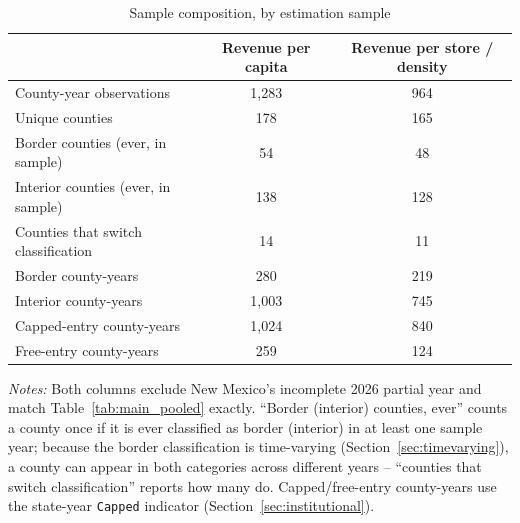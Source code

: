 \begin{table}[htbp]
\centering
\caption{Sample composition, by estimation sample}
\label{tab:sample_composition}
\begin{tabular}{lcc}
\toprule
 & Revenue per capita & Revenue per store / density \\
\midrule
County-year observations & 1,283 & 964 \\
Unique counties & 178 & 165 \\
\addlinespace
Border counties (ever, in sample) & 54 & 48 \\
Interior counties (ever, in sample) & 138 & 128 \\
Counties that switch classification & 14 & 11 \\
\addlinespace
Border county-years & 280 & 219 \\
Interior county-years & 1,003 & 745 \\
\addlinespace
Capped-entry county-years & 1,024 & 840 \\
Free-entry county-years & 259 & 124 \\
\bottomrule
\end{tabular}
\begin{minipage}{0.92\textwidth}
\vspace{0.3em}
\footnotesize
\textit{Notes:} Both columns exclude New Mexico's incomplete 2026 partial year and match
Table~\ref{tab:main_pooled} exactly. ``Border (interior) counties, ever'' counts a county once if it is
ever classified as border (interior) in at least one sample year; because the border classification is
time-varying (Section~\ref{sec:timevarying}), a county can appear in both categories across different
years -- ``counties that switch classification'' reports how many do. Capped/free-entry county-years use
the state-year \texttt{Capped} indicator (Section~\ref{sec:institutional}).
\end{minipage}
\end{table}
